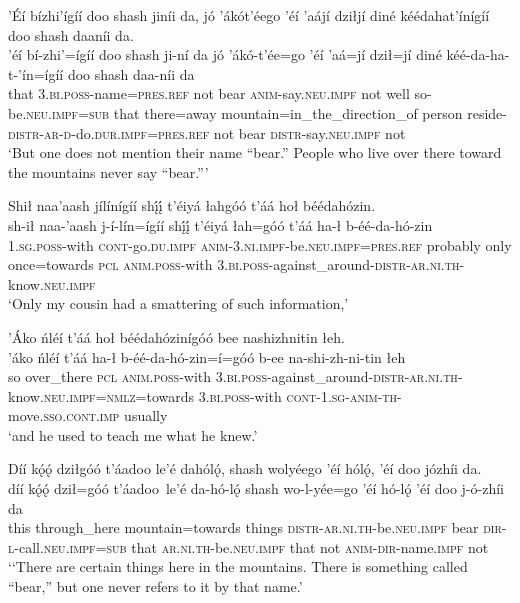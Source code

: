 \ea\label{ex:text6-2-2}
’Éí bízhi’ígíí doo shash jiníi da, jó ’ákót’éego ’éí ’aájí dziłjí diné kéédahat’ínígíí doo shash daaníi da.\\
\gll ’éí	bí-zhi’=ígíí	doo	shash	ji-ní	da	jó	’ákó-t’ée=go	’éí	’aá=jí	dził=jí	diné	kéé-da-ha-t-’ín=ígíí	doo	shash	daa-níi	da\\
     that	3.\textsc{bi}.\textsc{poss}-name=\textsc{pres}.\textsc{ref}	not	bear	\textsc{anim}-say.\textsc{neu}.\textsc{impf}	not	well	so-be.\textsc{neu}.\textsc{impf}=\textsc{sub}	that	there=away	mountain=in\_the\_direction\_of	person	reside-\textsc{distr}-\textsc{ar}-\textsc{d}-do.\textsc{dur}.\textsc{impf}=\textsc{pres}.\textsc{ref}	not	bear	\textsc{distr}-say.\textsc{neu}.\textsc{impf}	not\\
\glt `But one does not mention their name ``bear.'' People who live over there toward the mountains never say “bear.{''}'
\z

\newpage
\ea\label{ex:text6-2-3}
Shił naa’aash jílínígíí shį́į́ t’éiyá łahgóó t’áá hoł béédahózin.\\
\gll sh-ił	naa-’aash	j-í-lín=ígíí	shį́į́	t’éiyá	łah=góó	t’áá	ha-ł	b-éé-da-hó-zin\\
     1.\textsc{sg}.\textsc{poss}-with	\textsc{cont}-go.\textsc{du}.\textsc{impf}	\textsc{anim}-3.\textsc{ni}.\textsc{impf}-be.\textsc{neu}.\textsc{impf}=\textsc{pres}.\textsc{ref}	probably	only	once=towards	\textsc{pcl}	\textsc{anim}.\textsc{poss}-with	3.\textsc{bi}.\textsc{poss}-against\_around-\textsc{distr}-\textsc{ar}.\textsc{ni}.\textsc{th}-know.\textsc{neu}.\textsc{impf}\\
\glt `Only my cousin had a smattering of such information,'
\z

\ea\label{ex:text6-2-4}
’Áko ńléí t’áá hoł béédahózinígóó bee nashizhnitin łeh.\\
\gll ’áko	ńléí	t’áá	ha-ł	b-éé-da-hó-zin=í=góó	b-ee	na-shi-zh-ni-tin	łeh\\
     so	over\_there	\textsc{pcl}	\textsc{anim}.\textsc{poss}-with	3.\textsc{bi}.\textsc{poss}-against\_around-\textsc{distr}-\textsc{ar}.\textsc{ni}.\textsc{th}-know.\textsc{neu}.\textsc{impf}=\textsc{nmlz}=towards	3.\textsc{bi}.\textsc{poss}-with	\textsc{cont}-1.\textsc{sg}-\textsc{anim}-\textsc{th}-move.\textsc{sso}.\textsc{cont}.\textsc{imp}	usually\\
\glt `and he used to teach me what he knew.'
\z

\ea\label{ex:text6-2-5}
Díí kǫ́ǫ́ dziłgóó t’áadoo le’é dahólǫ́, shash wolyéego ’éí hólǫ́, ’éí doo józhíi da.\\
\gll díí	kǫ́ǫ́	dził=góó	t’áadoo~{le’é}	da-hó-lǫ́	shash	wo-l-yée=go	’éí	hó-lǫ́	’éí	doo	j-ó-zhíi	da\\
     this	through\_here	mountain=towards	things	\textsc{distr}-\textsc{ar}.\textsc{ni}.\textsc{th}-be.\textsc{neu}.\textsc{impf}	bear	\textsc{dir}-\textsc{l}-call.\textsc{neu}.\textsc{impf}=\textsc{sub}	that	\textsc{ar}.\textsc{ni}.\textsc{th}-be.\textsc{neu}.\textsc{impf}	that	not	\textsc{anim}-\textsc{dir}-name.\textsc{impf}	not\\
\glt `‘There are certain things here in the mountains. There is something called ``bear,'' but one never refers to it by that name.'
\z

